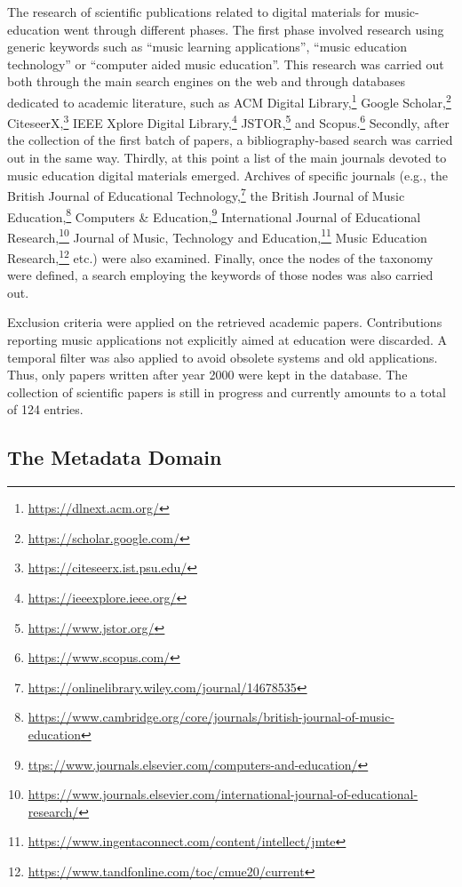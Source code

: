 \documentclass[10pt,journal,compsoc]{IEEEtran}
\begin{document}
The research of scientific publications related to digital materials for music-education went through different phases. The first phase involved research using generic keywords such as ``music learning applications'', ``music education technology'' or ``computer aided music education''. This research was carried out both through the main search engines on the web and through databases dedicated to academic literature, such as ACM Digital Library,\footnote{\url{https://dlnext.acm.org/}} Google Scholar,\footnote{\url{https://scholar.google.com/}} CiteseerX,\footnote{\url{https://citeseerx.ist.psu.edu/}} IEEE Xplore Digital Library,\footnote{\url{https://ieeexplore.ieee.org/}} JSTOR,\footnote{\url{https://www.jstor.org/}} and Scopus.\footnote{\url{https://www.scopus.com/}} Secondly, after the collection of the first batch of papers, a bibliography-based search was carried out in the same way. Thirdly, at this point a list of the main journals devoted to music education digital materials emerged. Archives of specific journals (e.g., the British Journal of Educational Technology,\footnote{\url{https://onlinelibrary.wiley.com/journal/14678535}} the British Journal of Music Education,\footnote{\url{https://www.cambridge.org/core/journals/british-journal-of-music-education}} Computers \& Education,\footnote{\url{ttps://www.journals.elsevier.com/computers-and-education/}} International Journal of Educational Research,\footnote{\url{https://www.journals.elsevier.com/international-journal-of-educational-research/}} Journal of Music, Technology and Education,\footnote{\url{https://www.ingentaconnect.com/content/intellect/jmte}} Music Education Research,\footnote{\url{https://www.tandfonline.com/toc/cmue20/current}} etc.) were also examined. Finally, once the nodes of the taxonomy were defined, a search employing the keywords of those nodes was also carried out.



Exclusion criteria were applied on the retrieved academic papers. Contributions reporting music applications not explicitly aimed at education were discarded. A temporal filter was also applied to avoid obsolete systems and old applications. Thus, only papers written after year 2000 were kept in the database.
The collection of scientific papers is still in progress and currently amounts to a total of 124 entries.

\subsection{The Metadata Domain}
\label{subsec:MeD}
\end{document}
